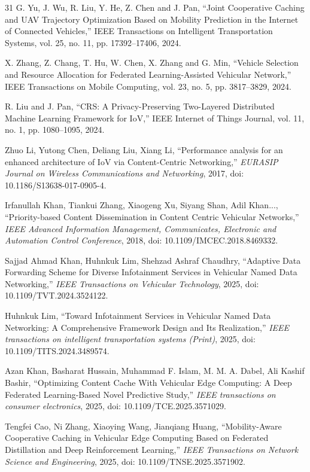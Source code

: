 \documentclass[journal]{IEEEtran}
\begin{document}
\begin{thebibliography}{31}
G. Yu, J. Wu, R. Liu, Y. He, Z. Chen and J. Pan, ``Joint Cooperative Caching and UAV Trajectory Optimization Based on Mobility Prediction in the Internet of Connected Vehicles,'' IEEE Transactions on Intelligent Transportation Systems, vol. 25, no. 11, pp. 17392--17406, 2024.

X. Zhang, Z. Chang, T. Hu, W. Chen, X. Zhang and G. Min, ``Vehicle Selection and Resource Allocation for Federated Learning-Assisted Vehicular Network,'' IEEE Transactions on Mobile Computing, vol. 23, no. 5, pp. 3817--3829, 2024.

R. Liu and J. Pan, ``CRS: A Privacy-Preserving Two-Layered Distributed Machine Learning Framework for IoV,'' IEEE Internet of Things Journal, vol. 11, no. 1, pp. 1080--1095, 2024.

Zhuo Li, Yutong Chen, Deliang Liu, Xiang Li, ``Performance analysis for an enhanced architecture of IoV via Content-Centric Networking,'' \textit{EURASIP Journal on Wireless Communications and Networking}, 2017, doi: 10.1186/S13638-017-0905-4.

Irfanullah Khan, Tiankui Zhang, Xiaogeng Xu, Siyang Shan, Adil Khan..., ``Priority-based Content Dissemination in Content Centric Vehicular Networks,'' \textit{IEEE Advanced Information Management, Communicates, Electronic and Automation Control Conference}, 2018, doi: 10.1109/IMCEC.2018.8469332.

Sajjad Ahmad Khan, Huhnkuk Lim, Shehzad Ashraf Chaudhry, ``Adaptive Data Forwarding Scheme for Diverse Infotainment Services in Vehicular Named Data Networking,'' \textit{IEEE Transactions on Vehicular Technology}, 2025, doi: 10.1109/TVT.2024.3524122.

Huhnkuk Lim, ``Toward Infotainment Services in Vehicular Named Data Networking: A Comprehensive Framework Design and Its Realization,'' \textit{IEEE transactions on intelligent transportation systems (Print)}, 2025, doi: 10.1109/TITS.2024.3489574.

Azan Khan, Basharat Hussain, Muhammad F. Islam, M. M. A. Dabel, Ali Kashif Bashir, ``Optimizing Content Cache With Vehicular Edge Computing: A Deep Federated Learning-Based Novel Predictive Study,'' \textit{IEEE transactions on consumer electronics}, 2025, doi: 10.1109/TCE.2025.3571029.

Tengfei Cao, Ni Zhang, Xiaoying Wang, Jianqiang Huang, ``Mobility-Aware Cooperative Caching in Vehicular Edge Computing Based on Federated Distillation and Deep Reinforcement Learning,'' \textit{IEEE Transactions on Network Science and Engineering}, 2025, doi: 10.1109/TNSE.2025.3571902.


\end{thebibliography}
\end{document}
